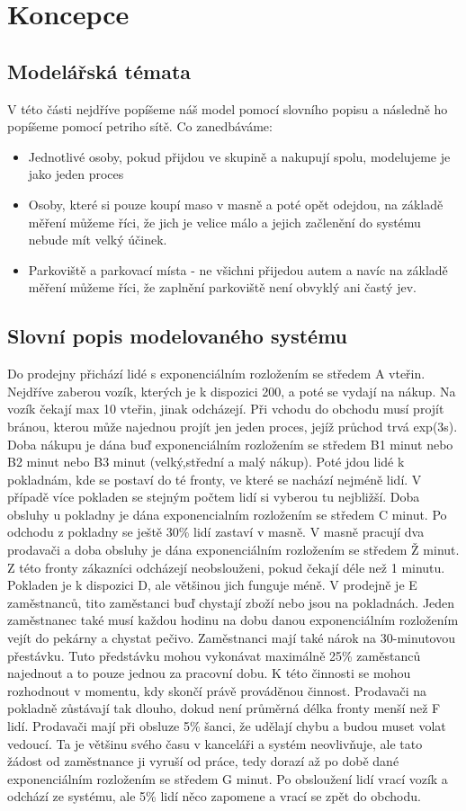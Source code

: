 \documentclass[12pt,a4paper,titlepage]{article}
\begin{document}
\section{Koncepce}
\subsection{Modelářská témata}
V této části nejdříve popíšeme náš model pomocí slovního popisu a následně ho popíšeme pomocí petriho sítě. Co zanedbáváme:
\begin{itemize}
\item Jednotlivé osoby, pokud přijdou ve skupině a nakupují spolu, modelujeme je jako jeden proces
\item Osoby, které si pouze koupí maso v masně a poté opět odejdou, na základě měření můžeme říci, že jich je velice málo a jejich začlenění do systému nebude mít velký účinek.
\item Parkoviště a parkovací místa - ne všichni přijedou autem a navíc na základě měření můžeme říci, že zaplnění parkoviště není obvyklý ani častý jev.
\end{itemize}
\subsection{Slovní popis modelovaného systému}
Do prodejny přichází lidé s exponenciálním rozložením se středem A vteřin.  Nejdříve zaberou vozík, kterých je k dispozici 200, a poté se vydají na nákup. Na vozík čekají max 10 vteřin, jinak odcházejí. Při vchodu do obchodu musí projít bránou, kterou může najednou projít jen jeden proces, jejíž průchod trvá exp(3s). Doba nákupu je dána  buď exponenciálním rozložením se středem B1 minut nebo B2 minut nebo B3 minut (velký,střední a malý nákup). Poté jdou lidé k pokladnám, kde se postaví do té fronty, ve které se nachází nejméně lidí. V případě více pokladen se stejným počtem lidí si vyberou tu nejbližší. Doba obsluhy u pokladny je dána exponencialním rozložením se středem C minut. Po odchodu z pokladny se ještě 30\% lidí zastaví v masně. V masně pracují dva prodavači a doba obsluhy je dána exponenciálním rozložením se středem Ž minut. Z této fronty zákazníci odcházejí neobslouženi, pokud čekají déle než 1 minutu. Pokladen je k dispozici D, ale většinou jich funguje méně. V prodejně je E zaměstnanců, tito zaměstanci buď chystají zboží nebo jsou na pokladnách. Jeden zaměstnanec také musí každou hodinu na dobu danou exponenciálním rozložením vejít do pekárny a chystat pečivo. Zaměstnanci mají také nárok na 30-minutovou přestávku. Tuto předstávku mohou vykonávat maximálně 25\% zaměstanců najednout a to pouze jednou za pracovní dobu. K této činnosti se mohou rozhodnout v momentu, kdy skončí právě prováděnou činnost. Prodavači na pokladně zůstávají tak dlouho, dokud není průměrná délka fronty menší než F lidí. Prodavači mají při obsluze 5\% šanci, že udělají chybu a budou muset volat vedoucí. Ta je většinu svého času v kanceláři a systém neovlivňuje, ale tato žádost od zaměstnance ji vyruší od práce, tedy dorazí až po době dané exponenciálním rozložením se středem G minut. Po obsloužení lidí vrací vozík a odchází ze systému, ale 5\% lidí něco zapomene a vrací se zpět do obchodu.
\end{document}
